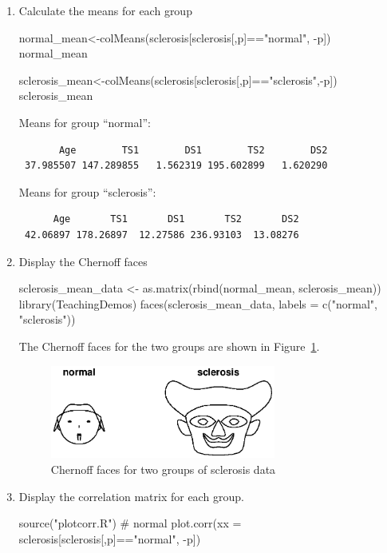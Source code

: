 \documentclass{article}
\begin{document}
\begin{enumerate}[leftmargin = 0 em, label = \arabic*., font = \bfseries]
\begin{enumerate}
\newpage
		\item 
		Calculate the means for each group
		\begin{rcode}
normal_mean<-colMeans(sclerosis[sclerosis[,p]=="normal", -p])
normal_mean

sclerosis_mean<-colMeans(sclerosis[sclerosis[,p]=="sclerosis",-p])
sclerosis_mean
		 \end{rcode} 
		 Means for group ``normal'':
		 \begin{verbatim}
       Age        TS1        DS1        TS2        DS2 
 37.985507 147.289855   1.562319 195.602899   1.620290 		 
		 \end{verbatim}
		 Means for group ``sclerosis'':
		 \begin{verbatim}
      Age       TS1       DS1       TS2       DS2 
 42.06897 178.26897  12.27586 236.93103  13.08276 
		 \end{verbatim}

		 \item 
		 Display the Chernoff faces 
		 \begin{rcode}
sclerosis_mean_data <- as.matrix(rbind(normal_mean, sclerosis_mean))
library(TeachingDemos)
faces(sclerosis_mean_data, labels = c("normal", "sclerosis"))
		 \end{rcode}
		 The Chernoff faces for the two groups are shown in Figure~\ref{2c}.
		 \begin{figure}[!htb]
		 	\centering
		 	\includegraphics[width=0.7\textwidth]{2c.eps}
		 	\caption{Chernoff faces for two groups of sclerosis data}
		 	\label{2c}
		 \end{figure}
\newpage
		 \item 
		 Display the correlation matrix for each group. 
		 \begin{rcode}
source("plotcorr.R")
# normal
plot.corr(xx = sclerosis[sclerosis[,p]=="normal", -p])


\end{rcode}
\end{enumerate}
\end{enumerate}
\end{document}
